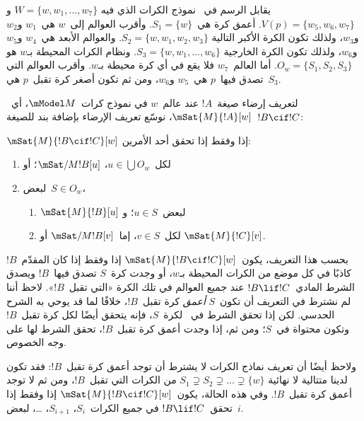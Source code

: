\documentclass[../../../include/open-logic-section]{subfiles}
\begin{document}
يقابل الرسم في~ نموذج الكرات الذي فيه
$W = \{w, w_1, \dots, w_7\}$ و$V(p) = \{w_5, w_6, w_7\}$.
أعمق كرة هي~$S_1 = \{w\}$. وأقرب العوالم إلى~$w$ هي~$w_1$ و$w_2$
و$w_3$، ولذلك تكون الكرة الأكبر التالية
$S_2 = \{w, w_1, w_2, w_3\}$. والعوالم الأبعد هي~$w_4$ و$w_5$
و$w_6$، ولذلك تكون الكرة الخارجية
$S_3 = \{w, w_1, \dots, w_6\}$. ونظام الكرات المحيطة بـ$w$ هو
$O_w = \{S_1, S_2, S_3\}$. أما العالم~$w_7$ فلا يقع في أي كرة
محيطة بـ$w$. وأقرب العوالم التي تصدق فيها~$p$ هي~$w_5$ و$w_6$،
ومن ثم تكون أصغر كرة تقبل~$p$ هي~$S_3$.

لتعريف إرضاء صيغة~$!A$ عند عالم~$w$ في نموذج كرات~$\mModel M$،
أي~$\mSat{M}{!A}[w]$، نوسّع تعريف الإرضاء بإضافة بند
للصيغة~$!B \cif !C$:

\begin{defn}
  $\mSat{M}{!B \cif !C}[w]$ إذا وفقط إذا تحقق أحد الأمرين:
  \begin{enumerate}
  \item{} لكل~$u \in \bigcup O_w$،
    $\mSat/{M}{!B}[u]$؛ أو
  \item{} لبعض~$S \in O_w$،
    \begin{enumerate}
      \item $\mSat{M}{!B}[u]$ لبعض~$u \in S$؛ و
      \item لكل~$v \in S$، إما~$\mSat/{M}{!B}[v]$ أو
        $\mSat{M}{!C}[v]$.
    \end{enumerate}
  \end{enumerate}
\end{defn}

بحسب هذا التعريف، يكون~$\mSat{M}{!B \cif !C}[w]$ إذا وفقط إذا كان
المقدّم~$!B$ كاذبًا في كل موضع من الكرات المحيطة بـ$w$، أو وجدت
كرة~$S$ تصدق فيها~$!B$ ويصدق الشرط المادي~$!B \lif !C$ عند جميع
العوالم في تلك الكرة «التي تقبل~$!B$». لاحظ أننا لم نشترط في التعريف
أن تكون~$S$ \emph{أعمق} كرة تقبل~$!B$، خلافًا لما قد يوحي به الشرح
الحدسي. لكن إذا تحقق الشرط في~ لكرة~$S$، فإنه
يتحقق أيضًا لكل كرة تقبل~$!B$ وتكون محتواة في~$S$؛ ومن ثم، إذا وجدت
أعمق كرة تقبل~$!B$، تحقق الشرط لها على وجه الخصوص.

ولاحظ أيضًا أن تعريف نماذج الكرات لا يشترط أن توجد أعمق كرة تقبل~$!B$:
فقد تكون لدينا متتالية لا نهائية
$S_1 \supsetneq S_2 \supsetneq \dots \supsetneq \{w\}$ من الكرات
التي تقبل~$!B$، ومن ثم لا توجد أعمق كرة تقبل~$!B$. وفي هذه الحالة،
يكون~$\mSat{M}{!B \cif !C}[w]$ إذا وفقط إذا تحقق~$!B \lif !C$
في جميع الكرات~$S_i$، $S_{i+1}$، \dots، لبعض~$i$.
\end{document}
